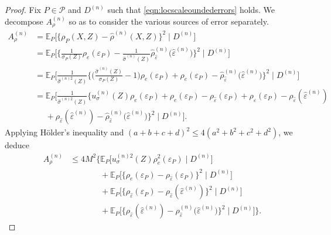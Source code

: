 \documentclass[aos]{imsart}
\newcommand{\E}{\mathbb{E}}
\begin{document}
\begin{proof}
		Fix $P\in\mathcal{P}$ and $D^{(n)}$ such that \eqref{eqn:locscaleoundederrors} holds. We decompose $A_\rho^{(n)}$ so as to consider the various sources of error separately.
		\begin{align*}
			A_\rho^{(n)} &= \E_P\Big[\big\{\rho_{P}(X,Z)-\hat \rho^{(n)}(X,Z)\big\}^2 \; \Big| \; D^{(n)}\Big]\\
			&=\E_P\Bigg[\bigg\{\frac1{\sigma_P(Z)}\rho_{e}(\varepsilon_P)-\frac{1}{\hat\sigma^{(n)}(Z)} \hat \rho_{\hat\varepsilon}^{(n)}\big(\hat\varepsilon^{(n)}\big)\bigg\}^2 \; \Bigg| \; D^{(n)}\Bigg]\\
			&=\E_P\Bigg[\frac1{\hat\sigma^{(n)2}(Z)}\bigg\{\bigg(\frac{\hat\sigma^{(n)}(Z)}{\sigma_P(Z)}-1\bigg) \rho_{e}(\varepsilon_P)+ \rho_{e}(\varepsilon_P) - \hat \rho_{\hat\varepsilon}^{(n)}\big(\hat\varepsilon^{(n)}\big)\bigg\}^2 \; \Bigg| \; D^{(n)}\Bigg]\\
			&=\E_P\Bigg[\frac1{\hat\sigma^{(n)2}(Z)}\bigg\{u_\sigma^{(n)}(Z) \rho_{e}(\varepsilon_P)+ \rho_{e}(\varepsilon_P) - \rho_{\hat\varepsilon}(\varepsilon_P) + \rho_{\hat\varepsilon}(\varepsilon_P) - \rho_{\hat\varepsilon}(\hat\varepsilon^{(n)}) \\
			&\phantom{=} + \rho_{\hat\varepsilon}(\hat\varepsilon^{(n)}) -\hat \rho_{\hat\varepsilon}^{(n)}\big(\hat\varepsilon^{(n)}\big)\bigg\}^2 \; \Bigg| \; D^{(n)}\Bigg].
		\end{align*}
		Applying H\"older's inequality and $(a+b+c+d)^2\leq 4(a^2+b^2+c^2+d^2)$, we deduce
		\begin{align}
			A_\rho^{(n)} &\leq 4 M^2 \bigg\{\E_P\big[u_\sigma^{(n)2}(Z) \rho_{e}^2(\varepsilon_P) \; \big|\; D^{(n)}\big] \nonumber\\
			&\phantom{\leq 4 M^2 \bigg\{} + \E_P\Big[ \big\{ \rho_{e}(\varepsilon_P) - \rho_{\hat\varepsilon}(\varepsilon_P) \big\}^2 \; \Big| \; D^{(n)} \Big] \nonumber\\
			& \phantom{\leq 4 M^2 \bigg\{} + \E_P\Big[ \big\{  \rho_{\hat\varepsilon}(\varepsilon_P) - \rho_{\hat\varepsilon}(\hat\varepsilon^{(n)}) \big\}^2 \; \Big| \; D^{(n)} \Big] \nonumber\\
			&\phantom{\leq 4 M^2 \bigg\{} + \E_P\Big[ \big\{  \rho_{\hat\varepsilon}(\hat\varepsilon^{(n)}) -\hat \rho_{\hat\varepsilon}^{(n)}\big(\hat\varepsilon^{(n)}\big)\big\}^2 \; \Big| \; D^{(n)} \Big]\bigg\}\label{eqn:locscalesubgdecomp}.
		\end{align}
		

\end{proof}
\end{document}
